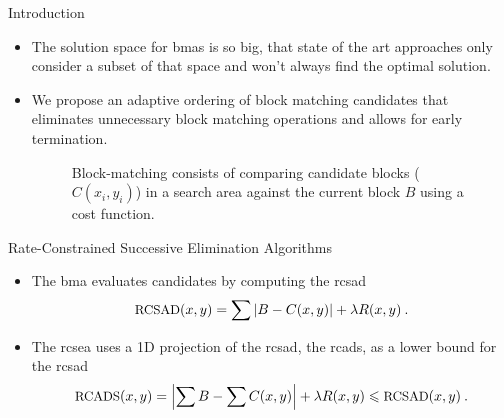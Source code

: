 \documentclass[10pt]{beamer}
\DeclarePairedDelimiter\abs{\lvert}{\rvert}%
\begin{document}
\begin{frame}[t]
\begin{columns}[t, onlytextwidth]
\begin{column}{0.32\textwidth}
\begin{block}{Introduction}
\begin{itemize}
            \item The solution space for \glspl{bma} is so big, that state of the art approaches only consider a subset of that space and won't always find the optimal solution.
                
            \item We propose an adaptive ordering of block matching candidates that eliminates unnecessary block matching operations and allows for early termination.
                
            \begin{figure}[htb]
                \vspace{-2em}
                \centering
                
                \vspace{-1em}
                \caption{Block-matching consists of comparing candidate blocks ($C(x_i,y_i)$) in a search area against the current block $B$ using a cost function.}
                \label{fig:MotionEstimation}
            \end{figure}
                
            \end{itemize}
        \end{block}
        

        \begin{block}{Rate-Constrained Successive Elimination Algorithms}
            \begin{itemize}
            \item The \gls{bma} evaluates candidates by computing the \gls{rcsad}
            \begin{equation}\small
                \text{RCSAD}(x,y) = \sum{\abs*{B - C(x,y)}} + \lambda R(x,y)\:.
                \label{eq:RCSAD}
            \end{equation}
                
            \item The \gls{rcsea} uses a 1D projection of the \gls{rcsad}, the \gls{rcads}, as a lower bound for the \gls{rcsad}
            \begin{equation}\small
                \text{RCADS}(x,y) = \abs*{\sum{B} - \sum{C(x,y)}} + \lambda R(x,y)\leqslant \text{RCSAD}(x,y)\:.
                \label{eq:RCADS}
            \end{equation}
        

\end{itemize}
\end{block}
\end{column}
\end{columns}
\end{frame}
\end{document}
